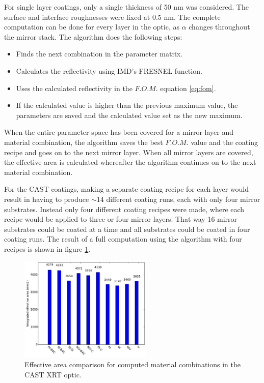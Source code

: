 For single layer coatings, only a single thickness of 50 nm was considered. The surface and interface roughnesses were fixed at 0.5 nm. The complete computation can be done for every layer in the optic, as $\alpha$ changes throughout the mirror stack. The algorithm does the following steps:
\begin{itemize}
  \item[\bf 1] Finds the next combination in the parameter matrix.
  \item[\bf 2] Calculates the reflectivity using IMD's FRESNEL function.
  \item[\bf 3] Uses the calculated reflectivity in the $F.O.M.$ equation \ref{eq:fom}.
  \item[\bf 4] If the calculated value is higher than the previous maximum value, the parameters are saved and the calculated value set as the new maximum.
\end{itemize}

When the entire parameter space has been covered for a mirror layer and material combination, the algorithm saves the best $F.O.M.$ value and the coating recipe and goes on to the next mirror layer. When all mirror layers are covered, the effective area is calculated whereafter the algorithm continues on to the next material combination.

For the CAST coatings, making a separate coating recipe for each layer would result in having to produce $\sim$14 different coating runs, each with only four mirror substrates. Instead only four different coating recipes were made, where each recipe would be applied to three or four mirror layers. That way 16 mirror substrates could be coated at a time and all substrates could be coated in four coating runs. The result of a full computation using the algorithm with four recipes is shown in figure \ref{fig:mat_result}.

\begin{figure}[htbp]
  \centering
    \includegraphics[height=5cm]{figures/cast/mat_result.pdf}
  \caption{\footnotesize Effective area comparison for computed material combinations in the CAST XRT optic.}
  \label{fig:mat_result}
\end{figure}

